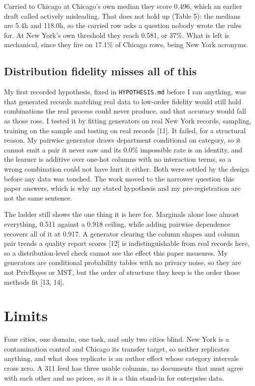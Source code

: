\documentclass[10pt,a4paper,twocolumn]{article}
\begin{document}
Carried to Chicago at Chicago's own median they score 0.496, which an earlier
draft called actively misleading. That does not hold up (Table 5): the medians
are 5.4h and 118.0h, so the carried row asks a question nobody wrote the rules
for. At New York's own threshold they reach 0.581, or 37\%. What is left is
mechanical, since they fire on 17.1\% of Chicago rows, being New York acronyms.

\subsection*{Distribution fidelity misses all of this}

My first recorded hypothesis, fixed in \texttt{HYPOTHESIS.md} before I ran anything, was
that generated records matching real data to low-order fidelity would still hold
combinations the real process could never produce, and that accuracy would fall
as those rose. I tested it by fitting generators on real New York records,
sampling, training on the sample and testing on real records [11]. It failed, for
a structural reason. My pairwise generator draws department conditional on
category, so it cannot emit a pair it never saw and its 0.0\% impossible rate is
an identity, and the learner is additive over one-hot columns with no interaction
terms, so a wrong combination could not have hurt it either. Both were settled by
the design before any data was touched. The work moved to the narrower question
this paper answers, which is why my stated hypothesis and my pre-registration are
not the same sentence.

The ladder still shows the one thing it is here for. Marginals alone lose almost
everything, 0.511 against a 0.918 ceiling, while adding pairwise dependence
recovers all of it at 0.917. A generator clearing the column shapes and column
pair trends a quality report scores [12] is indistinguishable from real records
here, so a distribution-level check cannot see the effect this paper measures. My
generators are conditional probability tables with no privacy noise, so they are
not PrivBayes or MST, but the order of structure they keep is the order those
methods fit [13, 14].

\section*{Limits}

Four cities, one domain, one task, and only two cities blind. New York is a
contamination control and Chicago its transfer target, so neither replicates
anything, and what does replicate is an author effect whose category intervals
cross zero. A 311 feed has three usable columns, no documents that must agree
with each other and no prices, so it is a thin stand-in for enterprise data.
\end{document}
